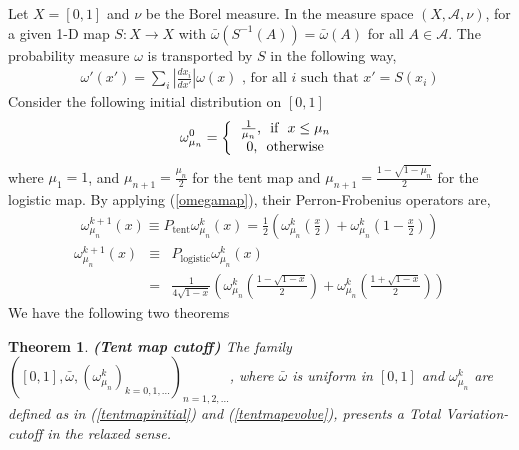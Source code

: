 \documentclass[landscape,a0b,final]{a0poster}
\newtheorem{theorem}{Theorem}
\newenvironment{poster}{
  \begin{center}
  \begin{minipage}[c]{0.98\textwidth}
}{
  \end{minipage} 
  \end{center}
}
\newenvironment{pcolumn}[1]{
  \begin{minipage}{#1\textwidth}
  \begin{center}
}{
  \end{center}
  \end{minipage}
}
\begin{document}
\begin{poster}
\begin{center}
\begin{pcolumn}{0.32}
{\vspace{0.4cm}
Let $X = [0,1]$ and $\nu$ be the Borel measure. In the measure space  $(X,\mathcal{A},\nu)$, for a given 1-D map $S: X \rightarrow X $ with $\bar{\omega}(S^{-1}(A))=\bar{\omega}(A)$ for all $A \in \mathcal{A}$. The probability measure $\omega$  is transported by $S$ in the following way, 
  \begin{eqnarray}
  \label{omegamap}
    \omega'(x') = \sum_i \left|\frac{dx_i}{dx'}\right|\omega(x) \mbox{   , for all } i \mbox{  such that  } x'=S(x_i)
  \end{eqnarray}
Consider the following initial distribution on $[0 ,1]$
  \begin{eqnarray}
  \label{tentmapinitial}
    \omega_{\mu_n}^0 = \left\{ \begin{tabular}{c}
                      $\frac{1}{\mu_n}$, \mbox{  if  } $x \le \mu_n$\\ 
                      $0$, \mbox{  otherwise} 
                      \end{tabular}\right.
  \end{eqnarray}
where $\mu_1 = 1$, and $\mu_{n+1} = \frac{\mu_n}{2}$ for the tent map and $\mu_{n+1}=\frac{1-\sqrt{1-\mu_n}}{2}$ for the logistic map. By applying (\ref{omegamap}), their Perron-Frobenius operators are,
  \begin{eqnarray}
  \label{tentmapevolve}
    \omega_{\mu_n}^{k+1}(x) \equiv P_\text{tent} \omega_{\mu_n}^{k}(x)
                             = \frac{1}{2}\left( \omega_{\mu_n}^{k}\left(\frac{x}{2}\right)+
                                                 \omega_{\mu_n}^{k}\left(1-\frac{x}{2}\right)  \right)
  \end{eqnarray}
 \begin{eqnarray}
 \label{logisticmapevolve}
    \omega_{\mu_n}^{k+1}(x) &\equiv &P_\text{logistic} \omega_{\mu_n}^{k}(x) \nonumber\\
                            &     = &\frac{1}{4\sqrt{1-x}}\left( \omega_{\mu_n}^{k}\left( \frac{1-\sqrt{1-x}}{2}\right)
                                            +\omega_{\mu_n}^{k}\left( \frac{1+\sqrt{1-x}}{2}\right) \right)
 \end{eqnarray}
We have the following two theorems

\begin{theorem} {\bfseries (Tent map cutoff)}
The family $([0,1],\bar{\omega}, (\omega^k_{\mu_n})_{k=0,1,...})_{n=1,2,...}$, where $\bar{\omega}$ is uniform in $[0,1]$ and $\omega^k_{\mu_n}$ are defined as in (\ref{tentmapinitial}) and (\ref{tentmapevolve}), presents a Total Variation-cutoff in the relaxed sense.
\end{theorem}

}
\end{pcolumn}
\end{center}
\end{poster}
\end{document}

